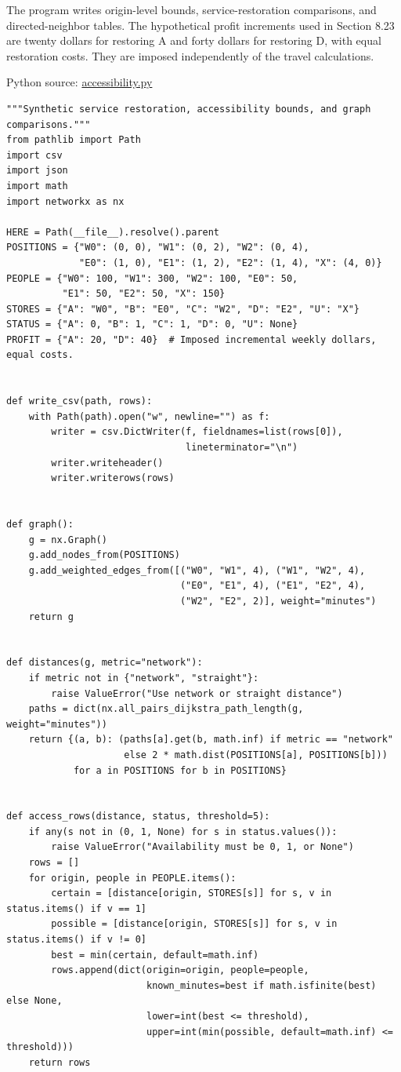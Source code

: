 The program writes origin-level bounds, service-restoration comparisons,
and directed-neighbor tables. The hypothetical profit increments used in
Section 8.23 are twenty dollars for restoring A and forty dollars for
restoring D, with equal restoration costs. They are imposed
independently of the travel calculations.

\FloatBarrier
{}
Python source:
\href{../03_Data_and_Code/Retail_Accessibility/accessibility.py}{accessibility.py}

\begin{Verbatim}[breaklines,breakanywhere,fontsize=\small]
"""Synthetic service restoration, accessibility bounds, and graph comparisons."""
from pathlib import Path
import csv
import json
import math
import networkx as nx

HERE = Path(__file__).resolve().parent
POSITIONS = {"W0": (0, 0), "W1": (0, 2), "W2": (0, 4),
             "E0": (1, 0), "E1": (1, 2), "E2": (1, 4), "X": (4, 0)}
PEOPLE = {"W0": 100, "W1": 300, "W2": 100, "E0": 50,
          "E1": 50, "E2": 50, "X": 150}
STORES = {"A": "W0", "B": "E0", "C": "W2", "D": "E2", "U": "X"}
STATUS = {"A": 0, "B": 1, "C": 1, "D": 0, "U": None}
PROFIT = {"A": 20, "D": 40}  # Imposed incremental weekly dollars, equal costs.


def write_csv(path, rows):
    with Path(path).open("w", newline="") as f:
        writer = csv.DictWriter(f, fieldnames=list(rows[0]),
                                lineterminator="\n")
        writer.writeheader()
        writer.writerows(rows)


def graph():
    g = nx.Graph()
    g.add_nodes_from(POSITIONS)
    g.add_weighted_edges_from([("W0", "W1", 4), ("W1", "W2", 4),
                               ("E0", "E1", 4), ("E1", "E2", 4),
                               ("W2", "E2", 2)], weight="minutes")
    return g


def distances(g, metric="network"):
    if metric not in {"network", "straight"}:
        raise ValueError("Use network or straight distance")
    paths = dict(nx.all_pairs_dijkstra_path_length(g, weight="minutes"))
    return {(a, b): (paths[a].get(b, math.inf) if metric == "network"
                     else 2 * math.dist(POSITIONS[a], POSITIONS[b]))
            for a in POSITIONS for b in POSITIONS}


def access_rows(distance, status, threshold=5):
    if any(s not in (0, 1, None) for s in status.values()):
        raise ValueError("Availability must be 0, 1, or None")
    rows = []
    for origin, people in PEOPLE.items():
        certain = [distance[origin, STORES[s]] for s, v in status.items() if v == 1]
        possible = [distance[origin, STORES[s]] for s, v in status.items() if v != 0]
        best = min(certain, default=math.inf)
        rows.append(dict(origin=origin, people=people,
                         known_minutes=best if math.isfinite(best) else None,
                         lower=int(best <= threshold),
                         upper=int(min(possible, default=math.inf) <= threshold)))
    return rows



\end{Verbatim}

